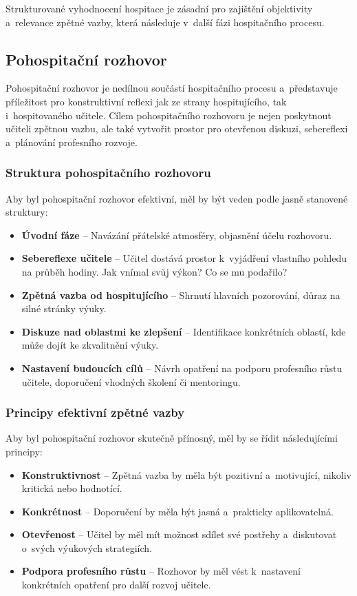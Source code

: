 Strukturované vyhodnocení hospitace je zásadní pro zajištění objektivity a~relevance zpětné vazby, která následuje v~další fázi hospitačního procesu.

\subsection{Pohospitační rozhovor}
Pohospitační rozhovor je nedílnou součástí hospitačního procesu a~představuje příležitost pro konstruktivní reflexi jak ze strany hospitujícího, tak i~hospitovaného učitele. Cílem pohospitačního rozhovoru je nejen poskytnout učiteli zpětnou vazbu, ale také vytvořit prostor pro otevřenou diskuzi, sebereflexi a~plánování profesního rozvoje.

\subsubsection{Struktura pohospitačního rozhovoru}
Aby byl pohospitační rozhovor efektivní, měl by být veden podle jasně stanovené struktury:
\begin{itemize}
    \item \textbf{Úvodní fáze} – Navázání přátelské atmosféry, objasnění účelu rozhovoru.
    \item \textbf{Sebereflexe učitele} – Učitel dostává prostor k~vyjádření vlastního pohledu na průběh hodiny. Jak vnímal svůj výkon? Co se mu podařilo?
    \item \textbf{Zpětná vazba od hospitujícího} – Shrnutí hlavních pozorování, důraz na silné stránky výuky.
    \item \textbf{Diskuze nad oblastmi ke zlepšení} – Identifikace konkrétních oblastí, kde může dojít ke zkvalitnění výuky.
    \item \textbf{Nastavení budoucích cílů} – Návrh opatření na podporu profesního růstu učitele, doporučení vhodných školení či mentoringu.
\end{itemize}

\subsubsection{Principy efektivní zpětné vazby}
Aby byl pohospitační rozhovor skutečně přínosný, měl by se řídit následujícími principy:
\begin{itemize}
    \item \textbf{Konstruktivnost} – Zpětná vazba by měla být pozitivní a~motivující, nikoliv kritická nebo hodnotící.
    \item \textbf{Konkrétnost} – Doporučení by měla být jasná a~prakticky aplikovatelná.
    \item \textbf{Otevřenost} – Učitel by měl mít možnost sdílet své postřehy a~diskutovat o~svých výukových strategiích.
    \item \textbf{Podpora profesního růstu} – Rozhovor by měl vést k~nastavení konkrétních opatření pro další rozvoj učitele.
\end{itemize}

